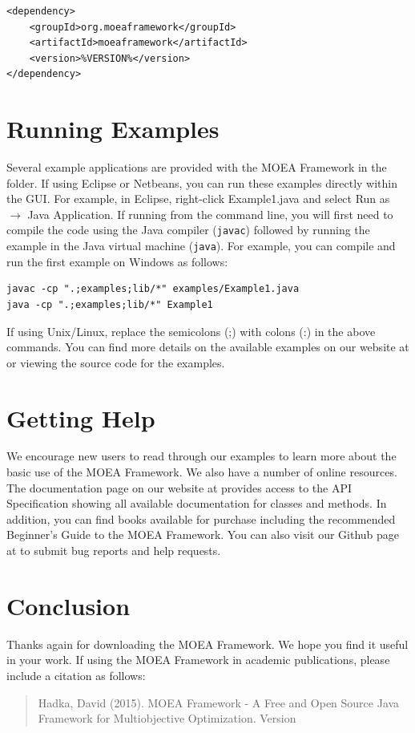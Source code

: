 \begin{lstlisting}[language=Plaintext]
<dependency>
	<groupId>org.moeaframework</groupId>
	<artifactId>moeaframework</artifactId>
	<version>%VERSION%</version>
</dependency>
\end{lstlisting}

\section{Running Examples}
Several example applications are provided with the MOEA Framework in the  folder.  If using Eclipse or Netbeans, you can run these examples directly within the GUI.  For example, in Eclipse, right-click Example1.java and select Run as $\rightarrow$ Java Application.  If running from the command line, you will first need to compile the code using the Java compiler (\texttt{javac}) followed by running the example in the Java virtual machine (\texttt{java}).  For example, you can compile and run the first example on Windows as follows:

\begin{lstlisting}[language=Plaintext]
javac -cp ".;examples;lib/*" examples/Example1.java
java -cp ".;examples;lib/*" Example1
\end{lstlisting}

\noindent
If using Unix/Linux, replace the semicolons (;) with colons (:) in the above commands.  You can find more details on the available examples on our website at  or viewing the source code for the examples.

\section{Getting Help}
We encourage new users to read through our examples to learn more about the basic use of the MOEA Framework.  We also have a number of online resources.  The documentation page on our website at  provides access to the API Specification showing all available documentation for classes and methods.  In addition, you can find books available for purchase including the recommended Beginner's Guide to the MOEA Framework.  You can also visit our Github page at  to submit bug reports and help requests.

\section{Conclusion}
Thanks again for downloading the MOEA Framework.  We hope you find it useful in your work.  If using the MOEA Framework in academic publications, please include a citation as follows:

\begin{quote}
  Hadka, David (2015).  MOEA Framework - A Free and Open Source Java Framework for Multiobjective Optimization. Version %
\end{quote}